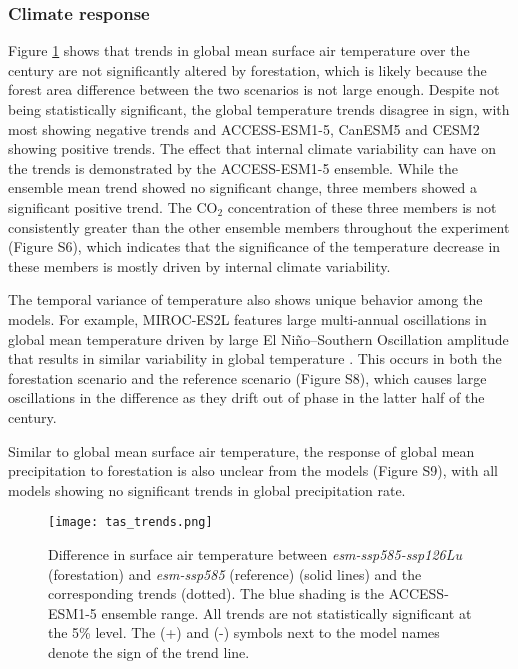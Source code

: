 \documentclass[draft]{agujournal2019}
\begin{document}
\subsubsection{Climate response}

Figure \ref{fig:models_tas_trends} shows that trends in global mean surface air temperature over the century are not significantly altered by forestation, which is likely because the forest area difference between the two scenarios is not large enough.
Despite not being statistically significant, the global temperature trends disagree in sign, with most showing negative trends and ACCESS-ESM1-5, CanESM5 and CESM2 showing positive trends.
The effect that internal climate variability can have on the trends is demonstrated by the ACCESS-ESM1-5 ensemble.
While the ensemble mean trend showed no significant change, three members showed a significant positive trend.
The CO$_2$ concentration of these three members is not consistently greater than the other ensemble members throughout the experiment (Figure S6), which indicates that the significance of the temperature decrease in these members is mostly driven by internal climate variability.

The temporal variance of temperature also shows unique behavior among the models.
For example, MIROC-ES2L features large multi-annual oscillations in global mean temperature driven by large El Niño–Southern Oscillation amplitude that results in similar variability in global temperature \cite{hajima_development_2020}.
This occurs in both the forestation scenario and the reference scenario (Figure S8), which causes large oscillations in the difference as they drift out of phase in the latter half of the century.

Similar to global mean surface air temperature, the response of global mean precipitation to forestation is also unclear from the models (Figure S9), with all models showing no significant trends in global precipitation rate.

\begin{figure}
    \texttt{[image: tas\_trends.png]}
    \caption{Difference in surface air temperature between \textit{esm-ssp585-ssp126Lu} (forestation) and \textit{esm-ssp585} (reference) (solid lines) and the corresponding trends (dotted). The blue shading is the ACCESS-ESM1-5 ensemble range. All trends are not statistically significant at the 5\% level. The (+) and (-) symbols next to the model names denote the sign of the trend line.}
    \label{fig:models_tas_trends}
\end{figure}
\end{document}
